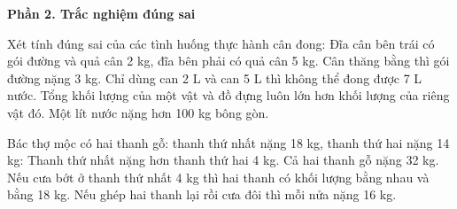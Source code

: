 \textbf{Phần 2. Trắc nghiệm đúng sai}

\begin{ex} %
Xét tính đúng sai của các tình huống thực hành cân đong:
\choiceTF
{\True Đĩa cân bên trái có gói đường và quả cân 2 kg, đĩa bên phải có quả cân 5 kg. Cân thăng bằng thì gói đường nặng 3 kg.}
{Chỉ dùng can 2 L và can 5 L thì không thể đong được 7 L nước.}
{\True Tổng khối lượng của một vật và đồ đựng luôn lớn hơn khối lượng của riêng vật đó.}
{Một lít nước nặng hơn 100 kg bông gòn.}
\end{ex}

\begin{ex} %
Bác thợ mộc có hai thanh gỗ: thanh thứ nhất nặng 18 kg, thanh thứ hai nặng 14 kg:
\choiceTF
{\True Thanh thứ nhất nặng hơn thanh thứ hai 4 kg.}
{\True Cả hai thanh gỗ nặng 32 kg.}
{Nếu cưa bớt ở thanh thứ nhất 4 kg thì hai thanh có khối lượng bằng nhau và bằng 18 kg.}
{\True Nếu ghép hai thanh lại rồi cưa đôi thì mỗi nửa nặng 16 kg.}
\end{ex}

